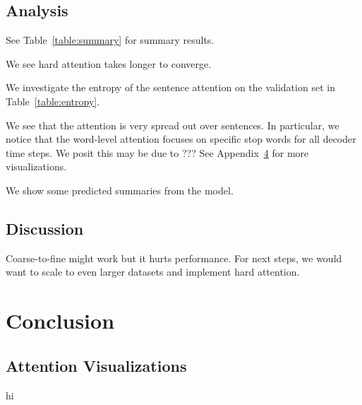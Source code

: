 \documentclass[12pt]{report}
\begin{document}
\section{Analysis}


See Table~\ref{table:summary} for summary results.


We see hard attention takes longer to converge.

We investigate the entropy of the sentence attention on the validation set in Table~\ref{table:entropy}.




We see that the attention is very spread out over sentences. In particular, we notice that the word-level attention focuses on specific stop words for all decoder time steps. We posit this may be due to ???
See Appendix~\ref{appendix:attn} for more visualizations.

We show some predicted summaries from the model.

\section{Discussion}

Coarse-to-fine might work but it hurts performance. For next steps, we would want to scale to even larger datasets and implement hard attention.

\chapter{Conclusion}
\label{chap:conclusion}






\begin{appendices}

\chapter{Attention Visualizations}
\label{appendix:attn}
hi

\end{appendices}
\end{document}
